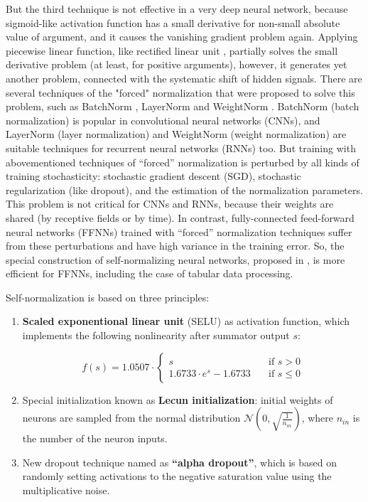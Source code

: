 \documentclass{article}
\begin{document}
But the third technique is not effective in a very deep neural network, because sigmoid-like activation function has a small derivative for non-small absolute value of argument, and it causes the vanishing gradient problem again. Applying piecewise linear function, like rectified linear unit \cite{glorot2011relu}, partially solves the small derivative problem (at least, for positive arguments), however, it generates yet another problem, connected with the systematic shift of hidden signals. There are several techniques of the "forced" normalization that were proposed to solve this problem, such as BatchNorm \cite{ioffe2015batchnorm}, LayerNorm \cite{Ba2016LayerN} and WeightNorm \cite{Salimans2016WeightNA}. BatchNorm (batch normalization) is popular in convolutional neural networks (CNNs), and LayerNorm (layer normalization) and WeightNorm (weight normalization) are suitable techniques for recurrent neural networks (RNNs) too. But training with abovementioned techniques of “forced” normalization is perturbed by all kinds of training stochasticity: stochastic gradient descent (SGD), stochastic regularization (like dropout), and the estimation of the normalization parameters. This problem is not critical for CNNs and RNNs, because their weights are shared (by receptive fields or by time). In contrast, fully-connected feed-forward neural networks (FFNNs) trained with “forced” normalization techniques suffer from these perturbations and have high variance in the training error. So, the special construction of self-normalizing neural networks, proposed in \cite{Klambauer2017}, is more efficient for FFNNs, including the case of tabular data processing.

Self-normalization is based on three principles:

\begin{enumerate}
    \item \textbf{Scaled exponentional linear unit} (SELU) as activation function, which implements the following nonlinearity after summator output \(s\):

\begin{displaymath}
f(s) = 1.0507 \cdot
  \begin{cases}
    s                           & \quad \text{if } s >    0 \\
    1.6733 \cdot e^{s} - 1.6733 & \quad \text{if } s \leq 0
  \end{cases}
\end{displaymath}

    \item Special initialization known as \textbf{Lecun initialization}: initial weights of neurons are sampled from the normal distribution \(\mathcal{N}(0, \sqrt{\frac{1}{n_{in}}})\), where \(n_{in}\) is the number of the neuron inputs.
    \item New dropout technique named as \textbf{“alpha dropout”}, which is based on randomly setting activations to the negative saturation value using the multiplicative noise.
\end{enumerate}
\end{document}
